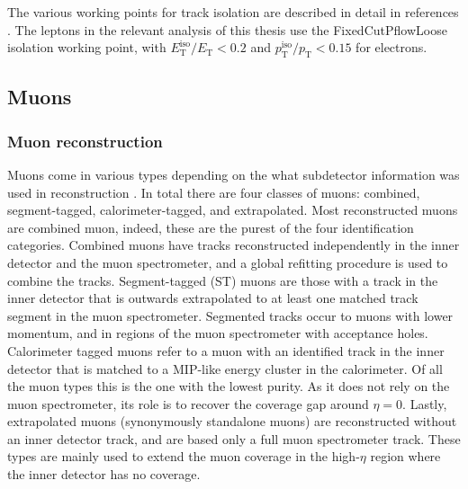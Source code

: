 The various working points for track isolation are described in detail in references \cite{ATLAS_electron_efficiency_2015-2016,ATLAS_electron_efficiency_2015-2017}. The leptons in the relevant analysis of this thesis use the FixedCutPflowLoose isolation working point, with $E_{\text{T}}^{\text{iso}}/E_{\text{T}}<0.2$ and $p_{\text{T}}^{\text{iso}}/p_{\text{T}}<0.15$ for electrons. 

\subsection{Muons}
\label{ssec:muonreco}
\subsubsection{Muon reconstruction}

Muons come in various types depending on the what subdetector information was used in reconstruction \cite{ATLAS_muon_reco_2015}. In total there are four classes of muons: combined, segment-tagged, calorimeter-tagged, and extrapolated. Most reconstructed muons are combined muon, indeed, these are the purest of the four identification categories. Combined muons have tracks reconstructed independently in the inner detector and the muon spectrometer, and a global refitting procedure is used to combine the tracks. Segment-tagged (ST) muons are those with a track in the inner detector that is outwards extrapolated to at least one matched track segment in the muon spectrometer. Segmented tracks occur to muons with lower momentum, and in regions of the muon spectrometer with acceptance holes. Calorimeter tagged muons refer to a muon with an identified track in the inner detector that is matched to a MIP-like energy cluster in the calorimeter. Of all the muon types this is the one with the lowest purity. As it does not rely on the muon spectrometer, its role is to recover the coverage gap around $\eta=0$. Lastly, extrapolated muons (synonymously standalone muons) are reconstructed without an inner detector track, and are based only a full muon spectrometer track. These types are mainly used to extend the muon coverage in the high-$\eta$ region where the inner detector has no coverage. 

